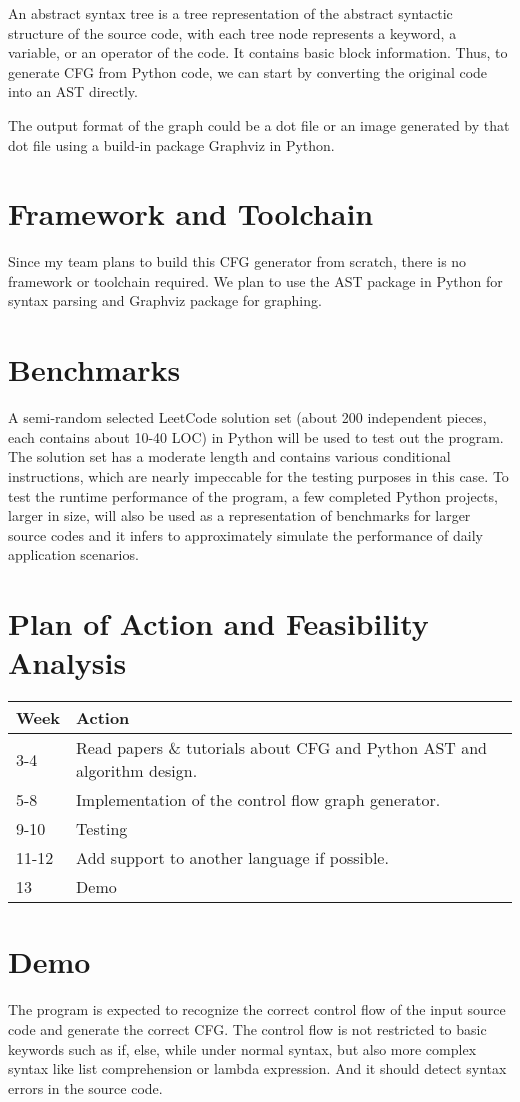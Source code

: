 \documentclass[11pt]{article}
\begin{document}
An abstract syntax tree is a tree representation of the abstract syntactic structure of the source code, with each tree node represents a keyword, a variable, or an operator of the code. It contains basic block information. Thus, to generate CFG from Python code, we can start by converting the original code into an AST directly.

The output format of the graph could be a dot file or an image generated by that dot file using a build-in package Graphviz in Python.

\section{Framework and Toolchain}\label{section-framework}
Since my team plans to build this CFG generator from scratch, there is no framework or toolchain required. We plan to use the AST package in Python for syntax parsing and Graphviz package for graphing.

\section{Benchmarks}\label{section-benchmarks}
A semi-random selected LeetCode solution set (about 200 independent pieces, each contains about 10-40 LOC) in Python will be used to test out the program. The solution set has a moderate length and contains various conditional instructions, which are nearly impeccable for the testing purposes in this case. To test the runtime performance of the program, a few completed Python projects, larger in size, will also be used as a representation of benchmarks for larger source codes and it infers to approximately simulate the performance of daily application scenarios.

\section{Plan of Action and Feasibility Analysis}\label{section-plan}
\begin{tabular}{| l | l |}
\hline
Week & Action \\ \hline
3-4 & Read papers \& tutorials about CFG and Python AST and algorithm design. \\ \hline
5-8 & Implementation of the control flow graph generator. \\ \hline
9-10 & Testing \\ \hline
11-12 & Add support to another language if possible. \\ \hline
13 & Demo \\ \hline
\end{tabular}

\section{Demo}\label{section-demo}
The program is expected to recognize the correct control flow of the input source code and generate the correct CFG. The control flow is not restricted to basic keywords such as if, else, while under normal syntax, but also more complex syntax like list comprehension or lambda expression. And it should detect syntax errors in the source code.
\end{document}
